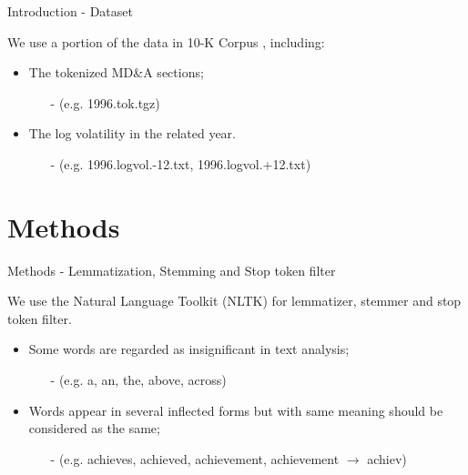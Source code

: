 \documentclass{beamer}
\begin{document}
\begin{frame}{Introduction - Dataset}

  We use a portion of the data in 10-K Corpus , including: \vspace{.25cm}

  \begin{itemize}
    \item The tokenized MD\&A sections;
          \begin{itemize}
            \item[-] (e.g. 1996.tok.tgz) \vspace{.25cm}
          \end{itemize}
    \item The log volatility in the related year.
          \begin{itemize}
            \item[-] (e.g. 1996.logvol.-12.txt, 1996.logvol.+12.txt) \vspace{.25cm}
          \end{itemize}
  \end{itemize}

\end{frame}

\section{Methods}

\begin{frame}{Methods - Lemmatization, Stemming and Stop token filter}

  We use the Natural Language Toolkit (NLTK)  for lemmatizer, stemmer and stop token filter. \vspace{.25cm}

  \begin{itemize}
    \item Some words are regarded as insignificant in text analysis;
          \begin{itemize}
            \item[-] (e.g. a, an, the, above, across) \vspace{.25cm}
          \end{itemize}
    \item Words appear in several inflected forms but with same meaning should be considered as the same;
          \begin{itemize}
            \item[-] (e.g. {achieves, achieved, achievement, achievement} $\rightarrow$ achiev) \vspace{.25cm}
          \end{itemize}
  \end{itemize}

\end{frame}
\end{document}
